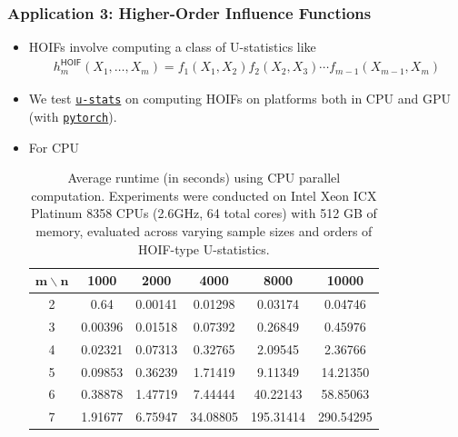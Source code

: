 \documentclass[9pt]{beamer}
\theoremstyle{mystyle}
\theoremstyle{mystyletwo}
\newcommand{\libref}[2]{\href{#2}{\texttt{#1}}}
\newcommand{\torch}{\libref{pytorch}{https://pytorch.org/}}
\def\package{\libref{u-stats}{https://github.com/Amedar-Asterisk/U-Statistics-python}}
\begin{document}
\begin{frame}
    \frametitle{Application 3: Higher-Order Influence Functions}
    \begin{itemize}
        \item HOIFs involve computing a class of U-statistics like
              \begin{align*}
                h^{\mathsf{HOIF}}_m(X_{1}, \ldots, X_{m})  = f_1(X_{1},X_{2})  f_2(X_{2},X_{3}) \cdots f_{m-1}(X_{m-1},X_{m})
              \end{align*}
        \item We test \package{} on computing HOIFs on platforms both in CPU and GPU (with \torch).
        \item For CPU
              \begin{table}[htbp]
                  \centering
                  \caption{Average runtime (in seconds) using CPU parallel computation. Experiments were conducted on Intel Xeon ICX Platinum 8358 CPUs (2.6GHz, 64 total cores) with 512 GB of memory, evaluated across varying sample sizes and orders of HOIF-type U-statistics.}
                  \label{tab:HOIF_CPU}
                  \begin{tabular}{cccccc}
                      \toprule
                      $\bm{m} \backslash \bm{n}$ & \textbf{1000} & \textbf{2000} & \textbf{4000} & \textbf{8000} & \textbf{10000} \\
                      \midrule
                      2                          & 0.64          & 0.00141       & 0.01298       & 0.03174       & 0.04746        \\
                      3                          & 0.00396       & 0.01518       & 0.07392       & 0.26849       & 0.45976        \\
                      4                          & 0.02321       & 0.07313       & 0.32765       & 2.09545       & 2.36766        \\
                      5                          & 0.09853       & 0.36239       & 1.71419       & 9.11349       & 14.21350       \\
                      6                          & 0.38878       & 1.47719       & 7.44444       & 40.22143      & 58.85063       \\
                      7                          & 1.91677       & 6.75947       & 34.08805      & 195.31414     & 290.54295      \\
                      \bottomrule
                  \end{tabular}
              \end{table}
    \end{itemize}
\end{frame}
\end{document}
